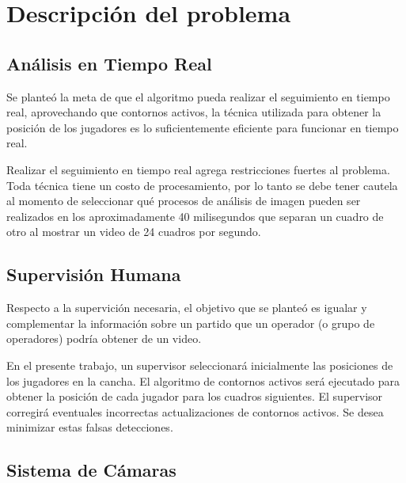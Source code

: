 \section{Descripción del problema}
\label{sec:problems}

\subsection{Análisis en Tiempo Real}

Se planteó la meta de que el algoritmo pueda realizar el seguimiento en tiempo
real, aprovechando que contornos activos, la técnica utilizada para obtener la
posición de los jugadores es lo suficientemente eficiente para funcionar en
tiempo real.

Realizar el seguimiento en tiempo real agrega restricciones fuertes al
problema. Toda técnica tiene un costo de procesamiento, por lo tanto se debe
tener cautela al momento de seleccionar qué procesos de análisis de imagen
pueden ser realizados en los aproximadamente 40 milisegundos que separan un
cuadro de otro al mostrar un video de 24 cuadros por segundo.

\subsection{Supervisión Humana}



Respecto a la supervición necesaria, el objetivo que se planteó es igualar y
complementar la información sobre un partido que un operador (o grupo de
operadores) podría obtener de un video.

En el presente trabajo, un supervisor seleccionará inicialmente las posiciones
de los jugadores en la cancha. El algoritmo de contornos activos será
ejecutado para obtener la posición de cada jugador para los cuadros siguientes.
El supervisor corregirá eventuales incorrectas actualizaciones de contornos
activos. Se desea minimizar estas falsas detecciones.

\subsection{Sistema de Cámaras}

